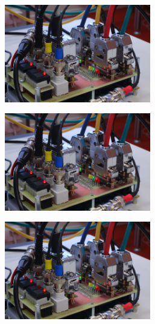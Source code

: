 \documentclass[arbeit=studie,oneside,BCOR=12mm]{ArbeitRST}
\begin{document}
\begin{figure}[ht]
\begin{subfigure}[c]{0.5\textwidth}
\centering
\includegraphics[width=0.7\textwidth]{bild}
\end{subfigure}
\begin{subfigure}[c]{0.5\textwidth}
\centering
\includegraphics[width=0.7\textwidth]{bild}
\end{subfigure}
\begin{subfigure}[c]{0.5\textwidth}
\centering
\includegraphics[width=0.7\textwidth]{bild}
\end{subfigure}
\begin{subfigure}[c]{0.5\textwidth}

\end{subfigure}
\end{figure}
\end{document}
